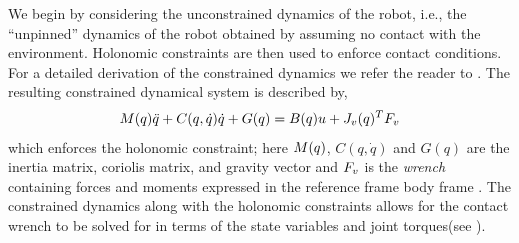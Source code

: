We begin by considering the unconstrained dynamics of the robot, i.e., the ``unpinned'' dynamics of the robot obtained by assuming no contact with the environment. Holonomic constraints are then used to enforce contact conditions. For a detailed derivation of the constrained dynamics we refer the reader to \cite{GCAS10}. The resulting constrained dynamical system is described by,
\begin{align}
 M(q)\ddot {q} + C(q,\dot{q})\dot{q} + G(q) = B(q) u + J_v(q)^T F_v
 \label{eq_eulerlagrangeconstrained}
\end{align}
which enforces the holonomic constraint; here $M(q)$, $C(q,\dot{q})$ and $G(q)$ are the inertia matrix, coriolis matrix, and gravity vector and $F_v$ is the \textit{wrench} containing forces and moments expressed in the reference frame body frame \cite{GCAS10}. The constrained dynamics along with the holonomic constraints allows for the contact wrench to be solved for in terms of the state variables and joint torques(see \cite{GCAS10}).
